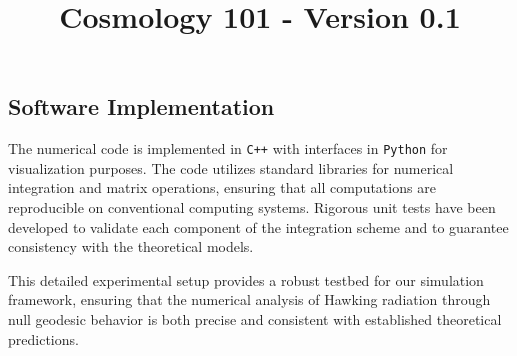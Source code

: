 \documentclass{article}\usepackage{graphicx} \usepackage{amsmath} \usepackage{colortbl}\title{Cosmology 101 - Version 0.1}
\begin{document}
\subsection{Software Implementation}
The numerical code is implemented in \texttt{C++} with interfaces in \texttt{Python} for visualization purposes. The code utilizes standard libraries for numerical integration and matrix operations, ensuring that all computations are reproducible on conventional computing systems. Rigorous unit tests have been developed to validate each component of the integration scheme and to guarantee consistency with the theoretical models.

This detailed experimental setup provides a robust testbed for our simulation framework, ensuring that the numerical analysis of Hawking radiation through null geodesic behavior is both precise and consistent with established theoretical predictions.
\end{document}
